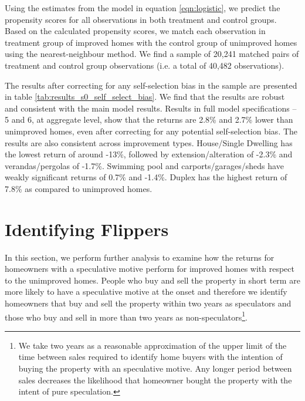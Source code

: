 \documentclass[AEJ,reqno, draftmode]{AEA} %
\begin{document}
Using the estimates from the model in equation \ref{eqn:logistic}, we predict the propensity scores for all observations in both treatment and control groups. Based on the calculated propensity scores, we match each observation in treatment group of improved homes with the control group of unimproved homes using the nearest-neighbour method. We find a sample of 20,241 matched pairs of treatment and control group observations (i.e. a total of 40,482 observations). 

The results after correcting for any self-selection bias in the sample are presented in table \ref{tab:results_s0_self_select_bias}. We find that the results are robust and consistent with the main model results. Results in full model specifications -- 5 and 6, at aggregate level, show that the returns are 2.8\% and 2.7\% lower than unimproved homes, even after correcting for any potential self-selection bias. The results are also consistent across improvement types. House/Single Dwelling has the lowest return of around -13\%, followed by extension/alteration of -2.3\% and verandas/pergolas of -1.7\%. Swimming pool and carports/garages/sheds have weakly significant returns of 0.7\% and -1.4\%. Duplex has the highest return of 7.8\% as compared to unimproved homes.




\restoregeometry






\clearpage

\section{Identifying Flippers}

In this section, we perform further analysis to examine how the returns for homeowners with a speculative motive perform for improved homes with respect to the unimproved homes. People who buy and sell the property in short term are more likely to have a speculative motive at the onset and therefore we identify homeowners that buy and sell the property within two years as speculators and those who buy and sell in more than two years as non-speculators\footnote{We take two years as a reasonable approximation of the upper limit of the time between sales required to identify home buyers with the intention of buying the property with an speculative motive. Any longer period between sales decreases the likelihood that homeowner bought the property with the intent of pure speculation.}.
\end{document}
